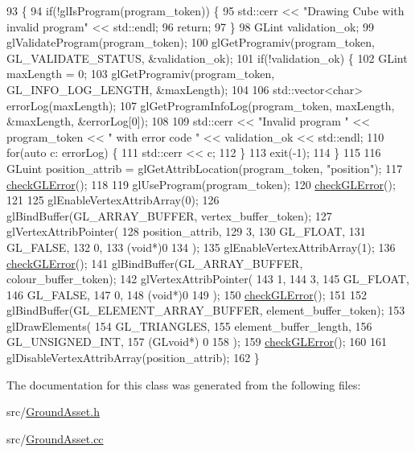 \begin{DoxyCode}
93                                            \{
94   \textcolor{keywordflow}{if}(!glIsProgram(program\_token)) \{
95     std::cerr << \textcolor{stringliteral}{"Drawing Cube with invalid program"} << std::endl;
96     \textcolor{keywordflow}{return};
97   \}
98   GLint validation\_ok;
99   glValidateProgram(program\_token);
100   glGetProgramiv(program\_token, GL\_VALIDATE\_STATUS, &validation\_ok);
101   \textcolor{keywordflow}{if}(!validation\_ok) \{
102     GLint maxLength = 0;
103     glGetProgramiv(program\_token, GL\_INFO\_LOG\_LENGTH, &maxLength);
104 
106     std::vector<char> errorLog(maxLength);
107     glGetProgramInfoLog(program\_token, maxLength, &maxLength, &errorLog[0]);
108 
109     std::cerr << \textcolor{stringliteral}{"Invalid program "} << program\_token << \textcolor{stringliteral}{" with error code "} << validation\_ok << std::endl;
110     \textcolor{keywordflow}{for}(\textcolor{keyword}{auto} c: errorLog) \{
111       std::cerr << c;
112     \}
113     exit(-1);
114   \}
115 
116   GLuint position\_attrib = glGetAttribLocation(program\_token, \textcolor{stringliteral}{"position"});
117   \hyperlink{GroundAsset_8cc_a75f201b0e53e68726854997957322b8d}{checkGLError}();
118 
119   glUseProgram(program\_token);
120   \hyperlink{GroundAsset_8cc_a75f201b0e53e68726854997957322b8d}{checkGLError}();
121 
125   glEnableVertexAttribArray(0);
126   glBindBuffer(GL\_ARRAY\_BUFFER, vertex\_buffer\_token);
127   glVertexAttribPointer(
128     position\_attrib,        
129     3,        
130     GL\_FLOAT,   
131     GL\_FALSE,   
132     0,        
133     (\textcolor{keywordtype}{void}*)0    
134   );
135   glEnableVertexAttribArray(1);
136   \hyperlink{GroundAsset_8cc_a75f201b0e53e68726854997957322b8d}{checkGLError}();
141   glBindBuffer(GL\_ARRAY\_BUFFER, colour\_buffer\_token);
142   glVertexAttribPointer(
143     1,        
144     3,        
145     GL\_FLOAT,   
146     GL\_FALSE,   
147     0,        
148     (\textcolor{keywordtype}{void}*)0    
149   );
150   \hyperlink{GroundAsset_8cc_a75f201b0e53e68726854997957322b8d}{checkGLError}();
151 
152   glBindBuffer(GL\_ELEMENT\_ARRAY\_BUFFER, element\_buffer\_token);
153   glDrawElements(
154     GL\_TRIANGLES,
155     element\_buffer\_length,
156     GL\_UNSIGNED\_INT,
157     (GLvoid*) 0
158   );
159   \hyperlink{GroundAsset_8cc_a75f201b0e53e68726854997957322b8d}{checkGLError}();
160 
161   glDisableVertexAttribArray(position\_attrib);
162 \}
\end{DoxyCode}


The documentation for this class was generated from the following files\+:\begin{DoxyCompactItemize}
\item 
src/\hyperlink{GroundAsset_8h}{Ground\+Asset.\+h}\item 
src/\hyperlink{GroundAsset_8cc}{Ground\+Asset.\+cc}\end{DoxyCompactItemize}
